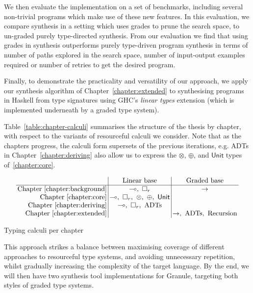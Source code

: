 \begin{enumerate}
        We then evaluate the implementation on a set of benchmarks, including
        several non-trivial programs which make use of these new features. In
        this evaluation, we compare synthesis in a setting which uses grades to
        prune the search space, to un-graded purely type-directed synthesis.
        From our evaluation we find that using grades in synthesis outperforms
        purely type-driven program synthesis in terms of number of paths
        explored in the search space, number of input-output examples required
        or number of retries to get the desired program.
        
        Finally, to demonstrate the practicality and versatility of our
        approach, we apply our synthesis algorithm of
        Chapter~\ref{chapter:extended} to synthesising programs in Haskell from
        type signatures using GHC's \emph{linear types} extension (which is
        implemented underneath by a graded type system).

\end{enumerate}

Table~\ref{table:chapter-calculi} summarises the structure of the thesis by
chapter, with respect to the variants of resourceful calculi we consider. Note
that as the chapters progress, the calculi form supersets of
the previous iterations, e.g. ADTs in Chapter~\ref{chapter:deriving} also allow
us to express the $\otimes$, $\oplus$, and $\mathsf{Unit}$ types
of~\ref{chapter:core}.
\begin{table}[H]
\begin{align*}
\setlength{\arraycolsep}{0.2em}
\begin{array}{r|c|c}
      & \text{ Linear base } & \text{ Graded base }\\
      \hline
      \text{Chapter~\ref{chapter:background}} & \multimap,\ \Box_r & \rightarrow \\
      \text{Chapter~\ref{chapter:core}} & \multimap,\ \Box_r,\ \otimes,\ \oplus,\ \mathsf{Unit} &  \\
      \text{Chapter~\ref{chapter:deriving}} & \multimap,\ \Box_r,\ \text{ADTs} & \\
      \text{Chapter~\ref{chapter:extended}} & & \rightarrow,\ \text{ADTs},\ \text{Recursion}
\end{array}
\end{align*}
\caption{Typing calculi per chapter}
\label{table:chapter-calculi}
\end{table}

This approach strikes a balance between maximising coverage of different
approaches to resourceful type systems, and avoiding unnecessary repetition,
whilst gradually increasing the complexity of the target language. By the end, we
will then have two synthesis tool implementations for Granule, targeting both
styles of graded type systems.

